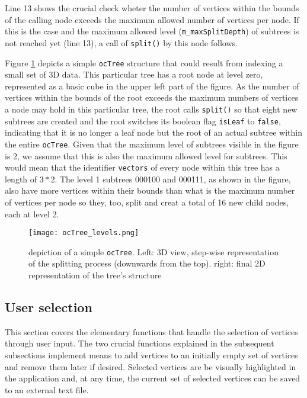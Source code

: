 Line 13 shows the crucial check wheter the number of vertices within the bounds of the calling node exceeds the maximum allowed number of vertices per node. If this is the case and the maximum allowed level (\texttt{m\_maxSplitDepth}) of subtrees is not reached yet (line 13), a call of \texttt{split()} by this node follows.

Figure \ref{fig:ocTree_levels.png} depicts a simple \texttt{ocTree} structure that could result from indexing a small set of 3D data. This particular tree has a root node at level zero, represented as a basic cube in the upper left part of the figure. As the number of vertices within the bounds of the root exceeds the maximum numbers of vertices a node may hold in this particular tree, the root calls \texttt{split()} so that eight new subtrees are created and the root switches its boolean flag \texttt{isLeaf} to \texttt{false}, indicating that it is no longer a leaf node but the root of an actual subtree within the entire \texttt{ocTree}. Given that the maximum level of subtrees visible in the figure is 2, we assume that this is also the maximum allowed level for subtrees. This would mean that the identifier \texttt{vectors} of every node within this tree has a length of $3*2$. The level 1 subtrees 000100 and 000111, as shown in the figure, also have more vertices within their bounds than what is the maximum number of vertices per node so they, too, split and creat a total of 16 new child nodes, each at level 2.

\begin{figure}[htb]
  \centering
  \texttt{[image: ocTree\_levels.png]}
  \caption{depiction of a simple \texttt{ocTree}. Left: 3D view, step-wise representation of the splitting process (downwards from the top). right: final 2D representation of the tree's structure}\label{fig:ocTree_levels.png}
\end{figure}


\pagebreak
\subsection{User selection}
\label{sec:user_selection}

This section covers the elementary functions that handle the selection of vertices through user input. The two crucial functions explained in the subsequent subsections implement means to add vertices to an initially empty set of vertices and remove them later if desired. Selected vertices are be visually highlighted in the application and, at any time, the current set of selected vertices can be saved to an external text file.

